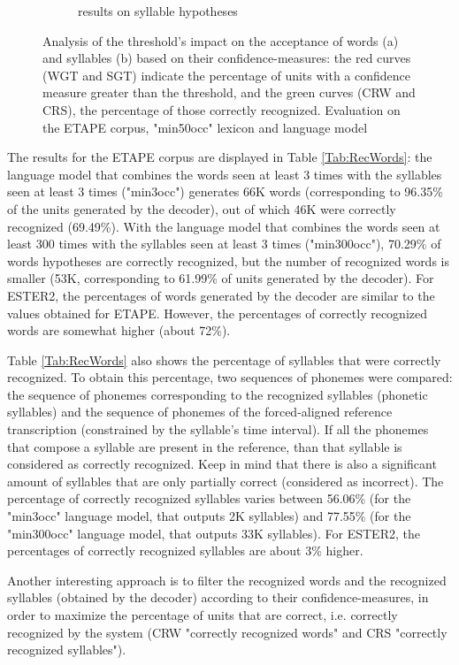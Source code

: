 \documentclass[a4paper]{article}
\begin{document}
\begin{figure}[t]
\begin{subfigure}[b]{0.45\textwidth}
                \caption{results on syllable hypotheses}
        \end{subfigure}
\caption{Analysis of the threshold's impact on the acceptance of words (a) and syllables (b) based on their confidence-measures: the red curves (WGT and SGT) indicate the percentage of units with a confidence measure greater than the threshold, and the green curves (CRW and CRS), the percentage of those correctly recognized. Evaluation on the ETAPE corpus, "min50occ" lexicon and language model}
\label{Fig:tc}
\end{figure}


The results for the ETAPE corpus are displayed in Table \ref{Tab:RecWords}: the language model that combines the words seen at least 3 times with the syllables seen at least 3 times ("min3occ") generates 66K words (corresponding to 96.35\% of the units generated by the decoder), out of which 46K were correctly recognized (69.49\%). With the language model that combines the words seen at least 300 times with the syllables seen at least 3 times ("min300occ"), 70.29\% of words hypotheses are correctly recognized, but the number of recognized words is smaller (53K, corresponding to 61.99\% of units generated by the decoder). For ESTER2, the percentages of words generated by the decoder are similar to the values obtained for ETAPE. However, the percentages of correctly recognized words are somewhat higher (about 72\%).

Table \ref{Tab:RecWords} also shows the percentage of syllables that were correctly recognized. To obtain this percentage, two sequences of phonemes were compared: the sequence of phonemes corresponding to the recognized syllables (phonetic syllables) and the sequence of phonemes of the forced-aligned reference transcription (constrained by the syllable's time interval). If all the phonemes that compose a syllable are present in the reference, than that syllable is considered as correctly recognized. Keep in mind that there is also a significant amount of syllables that are only partially correct (considered as incorrect). The percentage of correctly recognized syllables varies between 56.06\% (for the "min3occ" language model, that outputs 2K syllables) and 77.55\% (for the "min300occ" language model, that outputs 33K syllables). For ESTER2, the percentages of correctly recognized syllables are about 3\% higher.

Another interesting approach is to filter the recognized words and the recognized syllables (obtained by the decoder) according to their confidence-measures, in order to maximize the percentage of units that are correct, i.e. correctly recognized by the system (CRW "correctly recognized words" and CRS "correctly recognized syllables").
\end{document}
